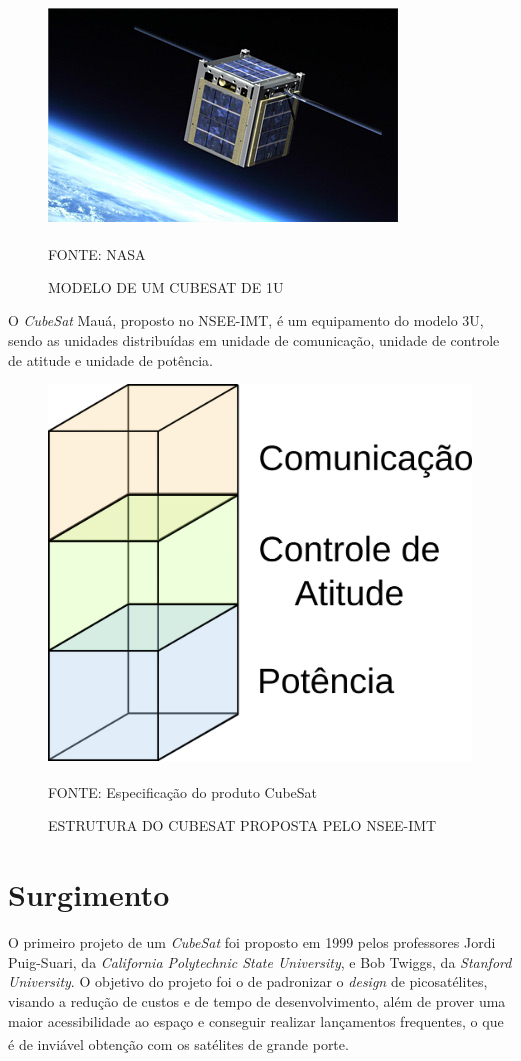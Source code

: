 \documentclass[
	12pt,				%
	openright,			%
	oneside,			%
	a4paper,			%
	english,			%
	french,				%
	spanish,			%
	brazil,				%
	oldfontcommands
	]{abntex2}
\begin{document}
	\begin{figure}[th]
		\caption{MODELO DE UM CUBESAT DE 1U}
		\centering
		\includegraphics[width=0.8\linewidth]{./figs/cubesat_01}
			
		\begin{small}
			FONTE: NASA\textsuperscript{\cite{NASA}}
		\end{small}		
	\end{figure}
		
	O \textit{CubeSat} Mauá, proposto no NSEE-IMT, é um equipamento do modelo 3U, sendo as unidades distribuídas em unidade de comunicação, unidade de controle de atitude e unidade de potência.
	
	\begin{figure}[th]
		\caption{ESTRUTURA DO CUBESAT PROPOSTA PELO NSEE-IMT}
		\centering
		\includegraphics[width=0.4\linewidth]{./figs/cubesat_02}
			
		\begin{small}
			FONTE: Especificação do produto CubeSat\textsuperscript{\cite{Corsi}}
		\end{small}		
	\end{figure}
	\pagebreak

\section[Surgimento]{Surgimento} 

	O primeiro projeto de um \textit{CubeSat} foi proposto em 1999 pelos professores Jordi Puig-Suari, da \textit{California Polytechnic State University}, e Bob Twiggs, da \textit{Stanford University}. O objetivo do projeto foi o de padronizar o \textit{design} de picosatélites, visando a redução de custos e de tempo de desenvolvimento, além de prover uma maior acessibilidade ao espaço e conseguir realizar lançamentos frequentes, o que é de inviável obtenção com os satélites de grande porte.\textsuperscript{\cite{CubeSat}}
\end{document}
